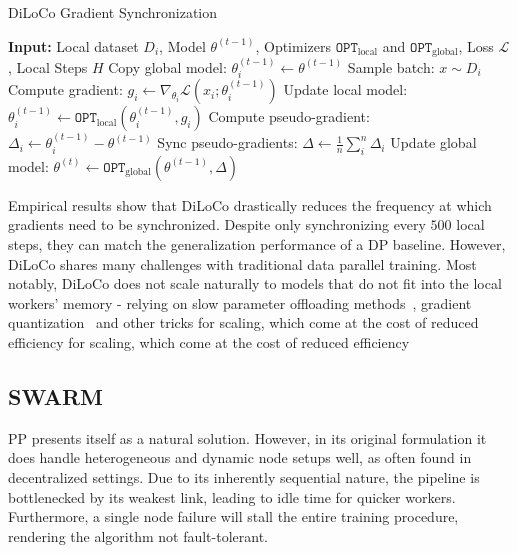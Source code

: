 \documentclass{article}
\begin{document}
\begin{algorithm}
\caption{DiLoCo Gradient Synchronization}
\label{alg:diloco}
\begin{algorithmic}[1]
\STATE \textbf{Input:} Local dataset $D_i$, Model $\theta^{(t-1)}$, Optimizers $\mathtt{OPT}_{\text{local}}$ and $\mathtt{OPT}_{\text{global}}$, Loss $\mathcal{L}$, Local Steps $H$ 
\STATE Copy global model: $\theta_i^{(t-1)} \gets \theta^{(t-1)}$
  \STATE Sample batch: $x \sim D_i$
  \STATE Compute gradient: $g_i \gets \nabla_{\theta_i} \mathcal{L}(x_i; \theta_i^{(t-1)})$
  \STATE Update local model: $\theta_i^{(t-1)} \gets \mathtt{OPT}_{\text{local}}(\theta_i^{(t-1)}, g_i)$
\ENDFOR
\STATE Compute pseudo-gradient: $\Delta_i \gets \theta_i^{(t-1)} - \theta^{(t-1)}$
\STATE Sync pseudo-gradients: $\Delta \gets \frac{1}{n}\sum_i^n \Delta_i$ 
\STATE Update global model: $\theta^{(t)} \gets \mathtt{OPT}_{\text{global}}(\theta^{(t-1)}, \Delta)$
\end{algorithmic}
\end{algorithm}

Empirical results show that DiLoCo drastically reduces the frequency at which
gradients need to be synchronized. Despite only synchronizing every $500$ local
steps, they can match the generalization performance of a DP baseline. However,
DiLoCo shares many challenges with traditional data parallel training. Most
notably, DiLoCo does not scale naturally to models that do not fit into the
local workers' memory - relying on slow parameter offloading
methods~\cite{rhu2016, cui2016}, gradient quantization~\cite{jaghouar2024intellect1} and
other tricks for scaling, which come at the cost of reduced efficiency for
scaling, which come at the cost of reduced efficiency

\subsection{SWARM}

PP presents itself as a natural solution. However, in its original formulation 
it does handle heterogeneous and dynamic node setups well, as often found in
decentralized settings. Due to its inherently sequential nature, the pipeline is
bottlenecked by its weakest link, leading to idle time for quicker workers.
Furthermore, a single node failure will stall the entire training procedure,
rendering the algorithm not fault-tolerant.
\end{document}
